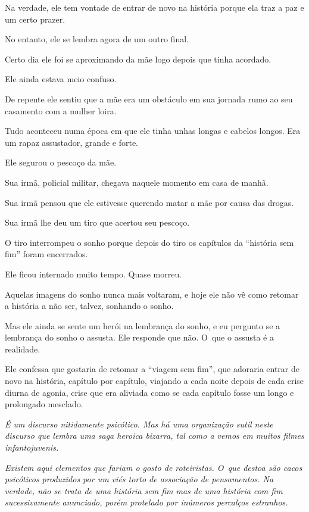 Na verdade, ele tem vontade de entrar de novo na história porque ela traz
a paz e um certo prazer.

No entanto, ele se lembra agora de um outro final.

Certo dia ele foi se aproximando da mãe logo depois que tinha acordado.

Ele ainda estava meio confuso.

De repente ele sentiu que a mãe era um obstáculo em sua jornada rumo ao
seu casamento com a mulher loira.

Tudo aconteceu numa época em que ele tinha unhas longas e cabelos
longos. Era um rapaz assustador, grande e forte.

Ele segurou o pescoço da mãe.

Sua irmã, policial militar, chegava naquele momento em casa de manhã.

Sua irmã pensou que ele estivesse querendo matar a mãe por causa das
drogas.

Sua irmã lhe deu um tiro que acertou seu pescoço.

O tiro interrompeu o sonho porque depois do tiro os capítulos da
``história sem fim'' foram encerrados.

Ele ficou internado muito tempo. Quase morreu.

Aquelas imagens do sonho nunca mais voltaram, e hoje ele não vê como
retomar a história a não ser, talvez, sonhando o sonho.

Mas ele ainda se sente um herói na lembrança do sonho, e eu pergunto se
a lembrança do sonho o assusta. Ele responde que não. O~que o assusta é
a realidade.

Ele confessa que gostaria de retomar a ``viagem sem fim'', que adoraria
entrar de novo na história, capítulo por capítulo, viajando a cada noite
depois de cada crise diurna de agonia, crise que era aliviada como se
cada capítulo fosse um longo e prolongado mesclado.

\begin{center}\asterisc{}\end{center}

\emph{É um discurso nitidamente psicótico. Mas há uma organização sutil
neste discurso que lembra uma saga heroica bizarra, tal como a vemos em
muitos filmes infantojuvenis.}

\emph{Existem aqui elementos que fariam o gosto de roteiristas. O~que
destoa são cacos psicóticos produzidos por um viés torto de associação
de pensamentos. Na verdade, não se trata de uma história sem fim mas de
uma história com fim sucessivamente anunciado, porém protelado por
inúmeros percalços estranhos.}

